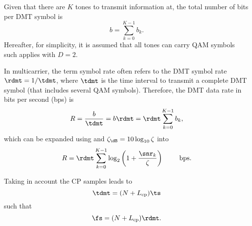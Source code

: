 Given that there are $K$ tones to transmit information at, the total number of bits per DMT symbol is
\begin{equation}
b = \sum_{k=0}^{K-1} b_k.
\end{equation}
Hereafter, for simplicity, it is assumed that all tones can carry QAM symbols such  applies with $D=2$.

In multicarrier, the term symbol rate often refers to the DMT symbol rate $\rdmt = 1/\tdmt$, where $\tdmt$ is the time interval to transmit a complete DMT symbol (that includes several QAM symbols). Therefore, the DMT data rate in bits per second (bps) is 
\begin{equation}
R = \frac{b}{\tdmt} = b \rdmt = \rdmt \sum_{k=0}^{K-1} b_k,
\end{equation}
which can be expanded using  and $\zeta_{\dB} = 10 \log_{10} \zeta$ into
\begin{equation}
R = \rdmt \sum_{k=0}^{K-1} \log_2 \left(1 + \frac{\snr_k}{\zeta}\right) \textrm{~~~~~~~bps}. 
\label{eq:rate}
\end{equation}

Taking in account the CP samples leads to
\[
\tdmt = (N + L_{\textrm{cp}}) \ts
\]
such that
\begin{equation}
\fs = (N+L_{\textrm{cp}}) \rdmt.
\label{eq:dmt_fs_rdmt}
\end{equation}


